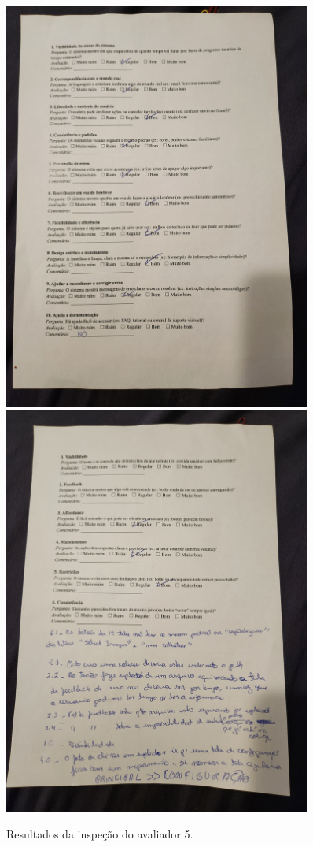 \begin{figure}[H]
    \centering
    \includegraphics[width=0.9\textwidth]{sections/appendix/resultados_inspecao_usabilidade/5 (1).jpg}
    \includegraphics[width=0.9\textwidth]{sections/appendix/resultados_inspecao_usabilidade/5 (2).jpg}
    \caption{Resultados da inspeção do avaliador 5.}
\end{figure}
